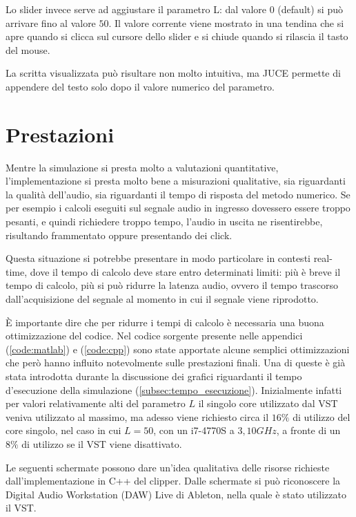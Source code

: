 		Lo slider invece serve ad aggiustare il parametro L: dal valore $0$ (default) si può arrivare fino al valore $50$. Il valore corrente viene mostrato in una tendina che si apre quando si clicca sul cursore dello slider e si chiude quando si rilascia il tasto del mouse.
		
		La scritta visualizzata può risultare non molto intuitiva, ma JUCE permette di appendere del testo solo dopo il valore numerico del parametro.
	
	\section{Prestazioni}
		Mentre la simulazione si presta molto a valutazioni quantitative, l'implementazione si presta molto bene a misurazioni qualitative, sia riguardanti la qualità dell'audio, sia riguardanti il tempo di risposta del metodo numerico. Se per esempio i calcoli eseguiti sul segnale audio in ingresso dovessero essere troppo pesanti, e quindi richiedere troppo tempo, l'audio in uscita ne risentirebbe, risultando frammentato oppure presentando dei click.
		
		Questa situazione si potrebbe presentare in modo particolare in contesti real-time, dove il tempo di calcolo deve stare entro determinati limiti: più è breve il tempo di calcolo, più si può ridurre la latenza audio, ovvero il tempo trascorso dall'acquisizione del segnale al momento in cui il segnale viene riprodotto.
		
		È importante dire che per ridurre i tempi di calcolo è necessaria una buona ottimizzazione del codice. Nel codice sorgente presente nelle appendici (\ref{code:matlab}) e (\ref{code:cpp}) sono state apportate alcune semplici ottimizzazioni che però hanno influito notevolmente sulle prestazioni finali. Una di queste è già stata introdotta durante la discussione dei grafici riguardanti il tempo d'esecuzione della simulazione (\ref{subsec:tempo_esecuzione}). Inizialmente infatti per valori relativamente alti del parametro $L$ il singolo core utilizzato dal VST veniva utilizzato al massimo, ma adesso viene richiesto circa il $16\%$ di utilizzo del core singolo, nel caso in cui $L = 50$, con un i7-4770S a $3,10GHz$, a fronte di un $8\%$ di utilizzo se il VST viene disattivato.
		
		Le seguenti schermate possono dare un'idea qualitativa delle risorse richieste dall'implementazione in C++ del clipper. Dalle schermate si può riconoscere la Digital Audio Workstation (DAW) Live di Ableton, nella quale è stato utilizzato il VST.
		
